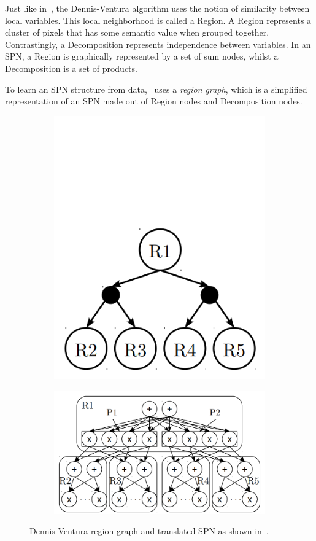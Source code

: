 Just like in~\cite{poon-domingos}, the Dennis-Ventura algorithm uses the notion of similarity
between local variables.  This local neighborhood is called a Region. A Region represents a cluster
of pixels that has some semantic value when grouped together. Contrastingly, a Decomposition
represents independence between variables. In an SPN, a Region is graphically represented by a set
of sum nodes, whilst a Decomposition is a set of products.

To learn an SPN structure from data,~\cite{clustering} uses a \textit{region graph}, which is a
simplified representation of an SPN made out of Region nodes and Decomposition nodes.

\begin{figure}[h]
  \begin{subfigure}{.4\linewidth}
    \centering\includegraphics[scale=1.0]{imgs/simple_dv.png}
    \caption{}
  \end{subfigure}
  \begin{subfigure}{.6\linewidth}
    \centering\includegraphics[scale=1.0]{imgs/trans_dv.png}
    \caption{}
  \end{subfigure}
  \caption{Dennis-Ventura region graph and translated SPN as shown in~\cite{clustering}.}
\end{figure}

